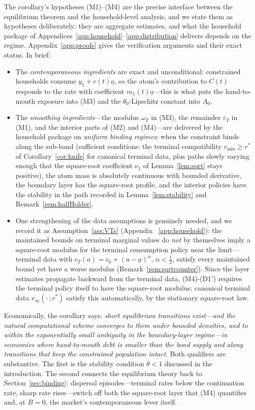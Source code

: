 \documentclass[11pt]{article}
\theoremstyle{definition}
\theoremstyle{remark}
\newcommand{\ubar}[1]{\underline{#1}}
\newcommand{\uba}{\ubar{a}}
\begin{document}
The corollary's hypotheses (M1)--(M4) are the precise interface
between the equilibrium theorem and the household-level analysis, and
we state them as hypotheses deliberately: they are aggregate
estimates, and what the household package of
Appendices~\ref{app:household}--\ref{app:distribution} delivers
depends on the regime. Appendix~\ref{app:proofs} gives the
verification arguments and their exact status. In brief:
\begin{itemize}[leftmargin=2em]
\item The \emph{contemporaneous ingredients} are exact and
unconditional: constrained households consume $y_1+r(t)\uba$, so the
atom's contribution to $C(t)$ responds to the rate with coefficient
$m_1(t)\uba$---this is what puts the hand-to-mouth exposure into
(M3) and the $\theta_0$-Lipschitz constant into $A_0$.
\item The \emph{smoothing ingredients}---the modulus $\omega_T$ in
(M3), the remainder $\varepsilon_T$ in (M1), and the interior parts of
(M2) and (M4)---are delivered by the household package on
\emph{uniform binding regimes}: when the constraint binds along the
sub-band (sufficient conditions: the terminal compatibility
$r_{\min}\ge r^*$ of Corollary~\ref{cor:knife} for canonical terminal
data, plus paths slowly varying enough that the square-root
coefficient $\nu_1$ of Lemma~\ref{lem:sqrt} stays positive), the atom
mass is absolutely continuous with bounded derivative, the boundary
layer has the square-root profile, and the interior policies have the
stability in the path recorded in Lemma~\ref{lem:stability} and
Remark~\ref{rem:halfHolder}.
\item One strengthening of the data assumptions is genuinely needed,
and we record it as Assumption~\ref{ass:VTs} (Appendix~%
\ref{app:household}): the maintained bounds on terminal marginal
values do \emph{not} by themselves imply a square-root modulus for the
terminal consumption policy near the limit---terminal data with
$c_T(a)=c_0+(a-\uba)^\alpha$, $\alpha<\tfrac12$, satisfy every
maintained bound yet have a worse modulus
(Remark~\ref{rem:sqrtcounter}). Since the layer estimates propagate
backward from the terminal data, (M4)-(D1$'$) requires the terminal
policy itself to have the square-root modulus; canonical terminal
data $v_\infty(\cdot\,;r^*)$ satisfy this automatically, by the
stationary square-root law.
\end{itemize}

Economically, the corollary says: \emph{short equilibrium transitions
exist---and the natural computational scheme converges to them under
bounded densities, and to within the exponentially small ambiguity in
the boundary-layer regime---in
economies where hand-to-mouth debt is smaller than the bond supply and
along transitions that keep the constrained population intact}. Both
qualifiers are substantive. The first is the stability condition
$\bar\theta<1$ discussed in the introduction. The second connects the
equilibrium theory back to Section~\ref{sec:binding}: dispersal
episodes---terminal rates below the continuation rate, sharp rate
rises---switch off both the square-root layer that (M4) quantifies
and, at $B=0$, the market's contemporaneous lever itself.
\end{document}
